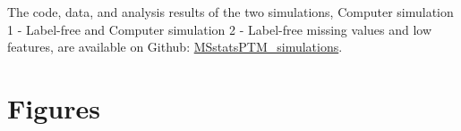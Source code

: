 \documentclass[mcp]{article}
\numberwithin{table}{section}
\begin{document}
The code, data, and analysis results of the two simulations, Computer simulation 1 - Label-free and Computer simulation 2 - Label-free missing values and low features, are available on Github: \href{https://github.com/devonjkohler/MSstatsPTM_simulations}{MSstatsPTM\_simulations}.


\newpage
\printbibliography


\newpage
\section{Figures}
\end{document}
